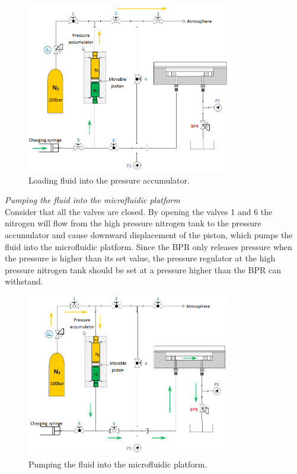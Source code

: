 \begin{figure}[ht]%
\centering
\includegraphics[width=0.8\textwidth]{figures/designandfabrication/figure3_35}%
\caption{Loading fluid into the pressure accumulator.}%
\label{figure3_35}%
\end{figure}

\noindent \textit{Pumping the fluid into the microfluidic platform}\\

Consider that all the valves are closed. By opening the valves 1 and 6 the nitrogen will flow from the high pressure nitrogen tank to the pressure accumulator and cause downward displacement of the piston, which pumps the fluid into the microfluidic platform. Since the BPR only releases pressure when the pressure is higher than its set value, the pressure regulator at the high pressure nitrogen tank should be set at a pressure higher than the BPR can withstand.\\
\clearpage

\begin{figure}[ht]%
\centering
\includegraphics[width=0.8\textwidth]{figures/designandfabrication/figure3_36}%
\caption{Pumping the fluid into the microfluidic platform.}%
\label{figure3_36}%
\end{figure}

